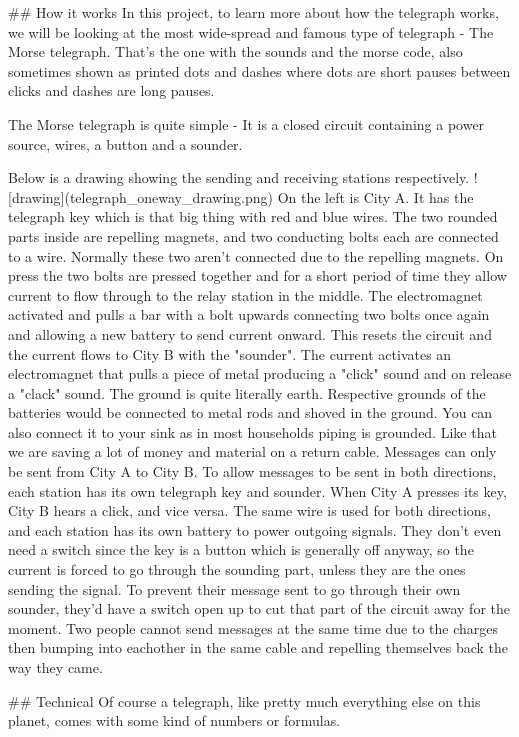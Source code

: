 ## How it works
In this project, to learn more about how the telegraph works, we will be looking at the most wide-spread and famous type of telegraph - The Morse telegraph. That's the one with the sounds and the morse code, also sometimes shown as printed dots and dashes where dots are short pauses between clicks and dashes are long pauses.

The Morse telegraph is quite simple - It is a closed circuit containing a power source, wires, a button and a sounder. 

Below is a drawing showing the sending and receiving stations respectively. 
![drawing](telegraph_oneway_drawing.png)
On the left is City A. It has the telegraph key which is that big thing with red and blue wires. The two rounded parts inside are repelling magnets, and two conducting bolts each are connected to a wire. Normally these two aren't connected due to the repelling magnets. On press the two bolts are pressed together and for a short period of time they allow current to flow through to the relay station in the middle. The electromagnet activated and pulls a bar with a bolt upwards connecting two bolts once again and allowing a new battery to send current onward. This resets the circuit and the current flows to City B with the "sounder". The current activates an electromagnet that pulls a piece of metal producing a "click" sound and on release a "clack" sound. The ground is quite literally earth. Respective grounds of the batteries would be connected to metal rods and shoved in the ground. You can also connect it to your sink as in most households piping is grounded. Like that we are saving a lot of money and material on a return cable. Messages can only be sent from City A to City B. To allow messages to be sent in both directions, each station has its own telegraph key and sounder. When City A presses its key, City B hears a click, and vice versa. The same wire is used for both directions, and each station has its own battery to power outgoing signals. They don't even need a switch since the key is a button which is generally off anyway, so the current is forced to go through the sounding part, unless they are the ones sending the signal. To prevent their message sent to go through their own sounder, they'd have a switch open up to cut that part of the circuit away for the moment. Two people cannot send messages at the same time due to the charges then bumping into eachother in the same cable and repelling themselves back the way they came. 

## Technical
Of course a telegraph, like pretty much everything else on this planet, comes with some kind of numbers or formulas. 

